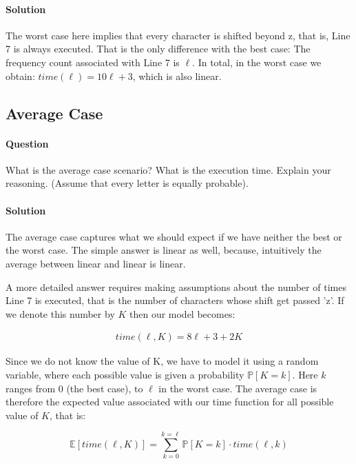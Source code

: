 \documentclass{article}
\begin{document}
\paragraph{Solution} The worst case here implies that every character
is shifted beyond z, that is, Line 7 is always executed. That is
the only difference with the best case: The frequency count associated
with Line 7 is $\ell$. In total, in the worst case we obtain:
$time(\ell) = 10 \ell + 3$, which is also linear.

\subsection{Average Case}

\paragraph{Question} What is the average case scenario? What is the
execution time. Explain your reasoning. (Assume that every letter is
equally probable).

\paragraph{Solution} The average case captures what we should expect
if we have neither the best or the worst case. The simple answer is
linear as well, because, intuitively the average between linear and
linear is linear.

A more detailed answer requires making assumptions about the number of
times Line 7 is executed, that is the number of characters whose shift
get passed 'z'. If we denote this number by $K$ then our model
becomes:

\begin{align*}
 time(\ell, K) = 8\ell + 3 + 2K
\end{align*}


Since we do not know the value of K, we have to model it using a
random variable, where each possible value is given a probability
$\mathbb{P}[K=k]$. Here $k$ ranges from 0 (the best case), to $\ell$
in the worst case. The average case is therefore the expected value
associated with our time function for all possible value of $K$, that
is:

\begin{equation}
  \mathbb{E}[time(\ell, K)] = \sum_{k=0}^{k=\ell} \mathbb{P}[K=k] \cdot time(\ell, k) \label{eq:expectation}
\end{equation}
\end{document}
